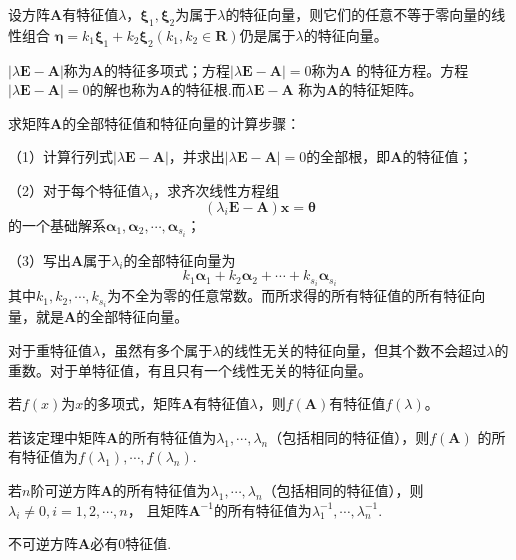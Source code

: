 \begin{theorem}
    设方阵$\boldsymbol{A}$有特征值$\lambda$，$\boldsymbol{\xi}_1,\boldsymbol{\xi}_2$为属于$\lambda$的特征向量，则它们的任意不等于零向量的线性组合
    $\boldsymbol{\eta}=k_1\boldsymbol{\xi}_1+k_2\boldsymbol{\xi}_2(k_1,k_2\in \mathbf{R})$仍是属于$\lambda$的特征向量。
\end{theorem}

\begin{definition}
    $|\lambda\boldsymbol{E}-\boldsymbol{A}|$称为$\boldsymbol{A}$的{\heiti 特征多项式}；方程$|\lambda\boldsymbol{E}-\boldsymbol{A}|=0$称为$\boldsymbol{A}$
    的{\heiti 特征方程}。方程$|\lambda\boldsymbol{E}-\boldsymbol{A}|=0$的解也称为$\boldsymbol{A}$的{\heiti 特征根}.而$\lambda\boldsymbol{E}-\boldsymbol{A}$
    称为$\boldsymbol{A}$的{\heiti 特征矩阵}。
\end{definition}


\begin{theorem}
    求矩阵$\boldsymbol{A}$的全部特征值和特征向量的计算步骤：

    （1）计算行列式$|\lambda\boldsymbol{E}-\boldsymbol{A}|$，并求出$|\lambda\boldsymbol{E}-\boldsymbol{A}|=0$的全部根，即$\boldsymbol{A}$的特征值；
    
    （2）对于每个特征值$\lambda_i$，求齐次线性方程组$$(\lambda_i\boldsymbol{E}-\boldsymbol{A})\boldsymbol{x}=\boldsymbol{\theta}$$的一个基础解系$\boldsymbol{\alpha}_1,\boldsymbol{\alpha}_2,\cdots,\boldsymbol{\alpha}_{s_i}$；

    （3）写出$\boldsymbol{A}$属于$\lambda_i$的全部特征向量为$$k_1\boldsymbol{\alpha}_1+k_2\boldsymbol{\alpha}_2+\cdots+k_{s_i}\boldsymbol{\alpha}_{s_i}$$
    其中$k_1,k_2,\cdots,k_{s_i}$为不全为零的任意常数。而所求得的所有特征值的所有特征向量，就是$\boldsymbol{A}$的全部特征向量。
\end{theorem}

\begin{remark}
    对于重特征值$\lambda$，虽然有多个属于$\lambda$的线性无关的特征向量，但其个数不会超过$\lambda$的重数。对于单特征值，有且只有一个线性无关的特征向量。
\end{remark}

\begin{theorem}
    若$f(x)$为$x$的多项式，矩阵$\boldsymbol{A}$有特征值$\lambda$，则$f(\boldsymbol{A})$有特征值$f(\lambda)$。
\end{theorem}
\begin{remark}
    若该定理中矩阵$\boldsymbol{A}$的所有特征值为$\lambda_1,\cdots,\lambda_n$（包括相同的特征值），则$f(\boldsymbol{A})$
    的所有特征值为$f(\lambda_1),\cdots,f(\lambda_n)$.
\end{remark}
\begin{remark}
    若$n$阶可逆方阵$\boldsymbol{A}$的所有特征值为$\lambda_1,\cdots,\lambda_n$（包括相同的特征值），则$\lambda_i\neq 0,i=1,2,\cdots,n$，
    且矩阵$\boldsymbol{A}^{-1}$的所有特征值为$\lambda_1^{-1},\cdots,\lambda_n^{-1}$.
\end{remark}
\begin{remark}
    不可逆方阵$\boldsymbol{A}$必有0特征值.
\end{remark}

